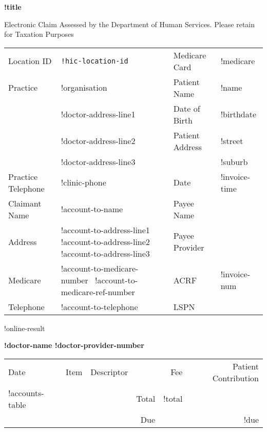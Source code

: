 \documentclass[12pt]{article}
\begin{document}
\begin{center}
{\bf \Large !title}

\vspace{3mm}

{\footnotesize Electronic Claim Assessed by the Department of Human Services. 
  Please retain for Taxation Purposes }

\end{center}

\vspace{8mm}

\begin{tabular}{llll}
  Location ID & \texttt{!hic-location-id} & Medicare Card & !medicare \\
  Practice & !organisation & Patient Name & !name \\
  & !doctor-address-line1 & Date of Birth & !birthdate \\
  & !doctor-address-line2 & Patient Address & !street \\
  & !doctor-address-line3 & & !suburb \\
 Practice Telephone & !clinic-phone & Date & !invoice-time & \\
 Claimant Name & !account-to-name & Payee Name & \\
 Address & !account-to-address-line1 !account-to-address-line2 !account-to-address-line3 & Payee Provider & \\
 Medicare & !account-to-medicare-number \ !account-to-medicare-ref-number & ACRF & !invoice-num \\
 Telephone & !account-to-telephone & LSPN & \\
\end{tabular}

\vspace{3mm}

!online-result

\vspace{3mm}

{\bf !doctor-name !doctor-provider-number}

\vspace{3mm}

\begin{tabularx}{\textwidth}{llp{50mm}rrr}
Date & Item & Descriptor & & Fee & Patient Contribution \\ \cmidrule(l){1-6}
!accounts-table
\cmidrule(l){5-6}
& & & Total & !total  & \\
& & & Due & & !due \\
\end{tabularx}
\end{document}
